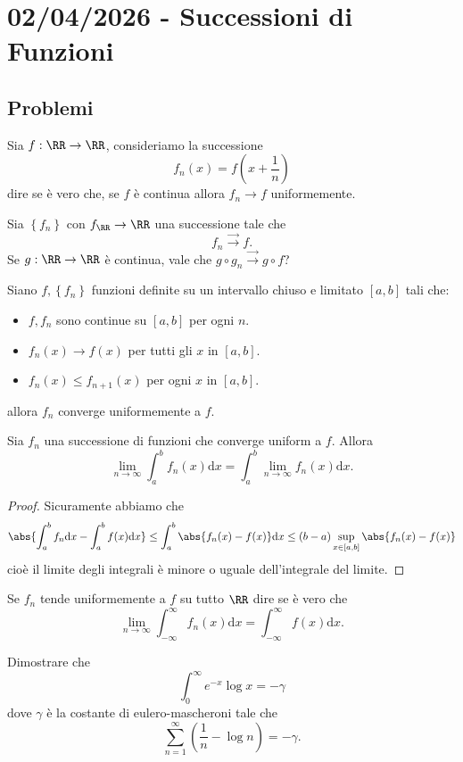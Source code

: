 \documentclass[11pt]{scrartcl}
\newcommand{\dif}{\text{d}}
\begin{document}
	\section{02/04/2026 - Successioni di Funzioni}
	
	\subsection{Problemi}
	
	\begin{problem}[Problema 1]
		Sia $f:\RR\to\RR$, consideriamo la successione
		$$f_n(x)=f\left(x+\frac{1}{n}\right)$$
		dire se è vero che, se $f$ è continua allora $f_n\to f$ uniformemente.
	\end{problem}
	\begin{problem}[Problema 2]
		Sia $\left\{f_n\right\}$ con $f_\RR\to\RR$ una successione tale che
		$$f_n \overset{\to}{\to} f.$$
		Se $g:\RR\to\RR$ è continua, vale che $g\circ g_n \overset{\to}{\to} g\circ f$?
	\end{problem}
	\begin{problem}[Problema 3]
		Siano $f,\left\{f_n\right\}$ funzioni definite su un intervallo chiuso e limitato $[a,b]$ tali che:
		\begin{itemize}
			\item $f,f_n$ sono continue su $[a,b]$ per ogni $n$.
			\item $f_n(x)\to f(x)$ per tutti gli $x$ in $[a,b]$.
			\item $f_n(x)\le f_{n+1}(x)$ per ogni $x$ in $[a,b]$.
		\end{itemize}
		allora $f_n$ converge uniformemente a $f$.
	\end{problem}
	\begin{theorem}
		Sia $f_n$ una successione di funzioni che converge uniform a $f$. Allora
		$$\lim_{n\to\infty}\int_a^b f_n(x)\dif x=\int_a^b\lim_{n\to\infty}f_n(x)\dif x.$$
	\end{theorem}
	\begin{proof}
		Sicuramente abbiamo che 
		$$\abs{\int_a^b f_n \dif x-\int_a^b f(x)\dif x}\le \int_a^b \abs{f_n(x)-f(x)}\dif x\le (b-a) \sup_{x\in [a,b]}\abs{f_n(x)-f(x)} $$
		cioè il limite degli integrali è minore o uguale dell'integrale del limite.
	\end{proof}
	\begin{problem}[Problema 4]
		Se $f_n$ tende uniformemente a $f$ su tutto $\RR$ dire se è vero che
		$$\lim_{n\to\infty}\int_{-\infty}^{\infty}f_n(x)\dif x=\int_{-\infty}^\infty f(x)\dif x.$$
	\end{problem}
	\begin{problem}[Problema 5]
		Dimostrare che 
		$$\int_0^\infty e^{-x}\log x = -\gamma$$
		dove $\gamma$ è la costante di eulero-mascheroni tale che
		$$\sum_{n=1}^{\infty}\left(\frac{1}{n}-\log n\right)=-\gamma.$$ 
	\end{problem}
	\newpage
	
\end{document}
